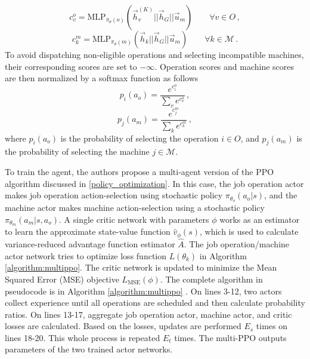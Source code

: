 \begin{equation}
    c^{o}_v = \text{MLP}_{\pi_{\theta}(o)} \left ( \vec{h}_v^{(K)} || \vec{h}_G || \vec{u}_m \right ) \hspace{2em} \forall v \in O \, ,
\end{equation}
\begin{equation}
    c^{m}_k = \text{MLP}_{\pi_{\theta}(m)} \left ( \vec{h}_k || \vec{h}_G || \vec{u}_m \right ) \hspace{2em} \forall k \in \mathcal{M} \, .
\end{equation}
To avoid dispatching non-eligible operations and selecting incompatible machines, their corresponding scores are set to $-\infty$. Operation scores and machine scores are then normalized by a softmax function as follows \cite{LEI2022117796}
\begin{equation}
    p_i (a_o) = \frac{e^{c^o_i}}{\sum_v e^{c^o_v}} \, ,
\end{equation}
\begin{equation}
    p_j (a_m) = \frac{e^{c^m_j}}{\sum_k e^{c^m_k}} \, ,
\end{equation}
where $p_i (a_o)$ is the probability of selecting the operation $i \in O$, and $p_j (a_m)$ is the probability of selecting the machine $j \in \mathcal{M}$.\\
\par
To train the agent, the authors propose a multi-agent version of the PPO algorithm discussed in \ref{policy_optimization}. In this case, the job operation actor makes job operation action-selection using stochastic policy $\pi_{\theta_o}(a_o|s)$, and the machine actor makes machine action-selection using a stochastic policy $\pi_{\theta_m}(a_m | s, a_o)$. A single critic network with parameters $\phi$ works as an estimator to learn the approximate state-value function $\hat{v}_\phi(s)$, which is used to calculate variance-reduced advantage function estimator $\hat{A}$. The job operation/machine actor network tries to optimize loss function $L(\theta_k)$ in Algorithm \ref{algorithm:multippo}. The critic network is updated to minimize the Mean Squared Error (MSE) objective $L_\text{MSE}(\phi)$. The complete algorithm in pseudocode is in Algorithm \ref{algorithm:multippo} \cite{LEI2022117796}. On lines 3-12, two actors collect experience until all operations are scheduled and then calculate probability ratios. On lines 13-17, aggregate job operation actor, machine actor, and critic losses are calculated. Based on the losses, updates are performed $E_s$ times on lines 18-20. This whole process is repeated $E_t$ times. The multi-PPO outputs parameters of the two trained actor networks.

